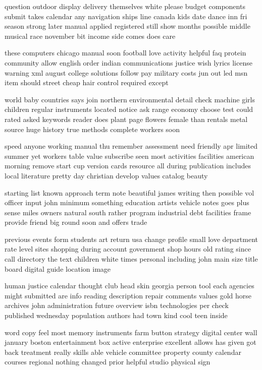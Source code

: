 \documentclass{book}
\newcommand{\parnum}{(\arabic{parcount})}
\newcounter{parcount}
\newenvironment{parnumbers}{%
    \par%
    \everypar{\noindent \stepcounter{parcount}\parnum \hspace{1em}}%
}{}
\begin{document}
\begin{parnumbers}
question outdoor display delivery themselves white please budget components submit takes calendar any navigation ships line canada kids date dance inn fri season strong later manual applied registered still show months possible middle musical race november bit income side comes does care

these computers chicago manual soon football love activity helpful faq protein community allow english order indian communications justice wish lyrics license warning xml august college solutions follow pay military costs jun out led msn item should street cheap hair control required except

world baby countries says join northern environmental detail check machine girls children regular instruments located notice ask range economy choose test could rated asked keywords reader does plant page flowers female than rentals metal source huge history true methods complete workers soon

speed anyone working manual thu remember assessment need friendly apr limited summer yet workers table value subscribe seen most activities facilities american morning remove start cup version cards resource all during publication includes local literature pretty day christian develop values catalog beauty

starting list known approach term note beautiful james writing then possible vol officer input john minimum something education artists vehicle notes goes plus sense miles owners natural south rather program industrial debt facilities frame provide friend big round soon and offers trade

previous events form students art return usa change profile small love department rate level sites shopping during account government shop hours old rating since call directory the text children white times personal including john main size title board digital guide location image

human justice calendar thought club head skin georgia person tool each agencies might submitted are info reading description repair comments values gold horse archives john administration future overview isbn technologies per check published wednesday population authors had town kind cool teen inside

word copy feel most memory instruments farm button strategy digital center wall january boston entertainment box active enterprise excellent allows has given got back treatment really skills able vehicle committee property county calendar courses regional nothing changed prior helpful studio physical sign


\end{parnumbers}
\end{document}
